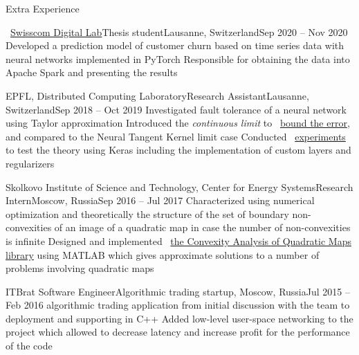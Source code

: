 \documentclass{resume} %
\newcommand*{\img}[1]{%
	\raisebox{-.02\baselineskip}{%
		\texttt{[image: \#1]}%
	}%
}
\newcommand*{\emoji}[1]{\img{./emoji/\imgpref#1.png}}
\newcommand*{\mybold}[1]{{\color{gray} #1}}
\def\imgpref{bleak-}
\newcommand{\mylink}{{\color{gray}\faExternalLink}}
\begin{document}
\begin{rSection}{Extra Experience}
	\begin{rSubsection}{\mylink~\href{https://research.swisscom.ai/}{Swisscom Digital Lab}}{Thesis student}{Lausanne, Switzerland}{Sep 2020 -- Nov 2020}
	\myitem Developed a prediction model of customer churn based on time series data with neural networks implemented in PyTorch
	\myitem Responsible for obtaining the data into Apache Spark and presenting the results
	\end{rSubsection}
	
	\begin{rSubsection}{EPFL, Distributed Computing Laboratory}{Research Assistant}{Lausanne, Switzerland}{Sep 2018 -- Oct 2019}
		\myitem Investigated \mybold{fault tolerance} of a neural network using \mybold{Taylor approximation}
		\myitem Introduced the {\em continuous limit} to \mylink~\href{https://arxiv.org/abs/1902.01686}{bound the error}, and compared to the Neural Tangent Kernel limit case
		\myitem Conducted \mylink~\href{https://github.com/LPD-EPFL/ProbabilisticFaultToleranceNNs}{experiments} to test the theory using \mybold{Keras} including the \mybold{implementation} of custom layers and regularizers
	\end{rSubsection}

	\begin{rSubsection}{Skolkovo Institute of Science and Technology, Center for Energy Systems}{Research Intern}{Moscow, Russia}{Sep 2016 -- Jul 2017}
	\myitem Characterized using \mybold{numerical optimization} and \mybold{theoretically} the structure of the set of boundary non-convexities of an image of a quadratic map in case the number of non-convexities is infinite
	\myitem Designed and implemented \mylink~\href{https://github.com/sergeivolodin/CAQM}{the Convexity Analysis of Quadratic Maps \mybold{library}} using \mybold{MATLAB} which gives approximate solutions to a number of problems involving quadratic maps
   \end{rSubsection}

	\begin{rSubsection}{ITBrat \emoji{stocks}}{Software Engineer}{Algorithmic trading startup, Moscow, Russia}{Jul 2015 -- Feb 2016}
		\myitem \mybold{Developed} algorithmic trading application from initial discussion with the team to deployment and supporting in \mybold{C++}
		\myitem Added low-level user-space networking to the project which allowed to decrease latency and increase profit
		\myitem \mybold{Responsible} for the performance of the code
	\end{rSubsection}
\end{rSection}
\end{document}
